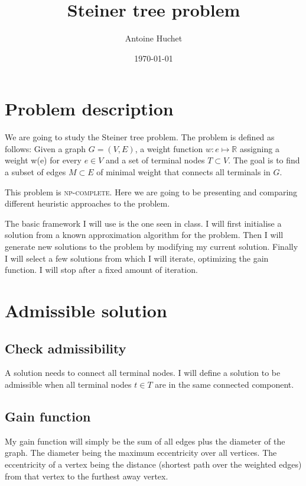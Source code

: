 \documentclass{article}
\title{Steiner tree problem}
\date{\today}
\author{Antoine Huchet}
\theoremstyle{plain} %
\theoremstyle{definition} %
\begin{document}
 \maketitle

\section{Problem description}

We are going to study the Steiner tree problem. The problem is defined as
follows: Given a graph $G=(V,E)$, a weight function $w: e \mapsto \mathbb{R}$
assigning a weight w(e) for every $e \in V$  and a set of terminal nodes $T
\subset V$. The goal is to find a subset of edges $M \subset E$ of minimal
weight that connects all terminals in $G$.

This problem is \textsc{np-complete}. Here we are going to be presenting and
comparing different heuristic approaches to the problem.

The basic framework I will use is the one seen in class. I will first
initialise a solution from a known approximation algorithm for the problem.
Then I will generate new solutions to the problem by modifying my current
solution. Finally I will select a few solutions from which I will iterate,
optimizing the gain function. I will stop after a fixed amount of iteration.

\section{Admissible solution}

\subsection{Check admissibility}

A solution needs to connect all terminal nodes. I will define a solution to be
admissible when all terminal nodes $t \in T$ are in the same connected
component.

\subsection{Gain function}

My gain function will simply be the sum of all edges plus the diameter of the
graph. The diameter being the maximum eccentricity over all vertices. The
eccentricity of a vertex being the distance (shortest path over the weighted
edges) from that vertex to the furthest away vertex.
\end{document}
